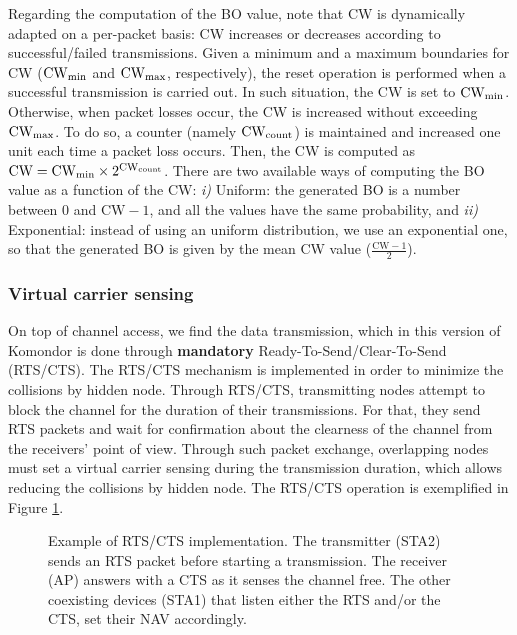 \documentclass[a4paper]{article}
\begin{document}
	Regarding the computation of the BO value, note that CW is dynamically adapted on a per-packet basis: CW increases or decreases according to successful/failed transmissions. Given a minimum and a maximum boundaries for CW ($\rm CW_{\rm min}$ and $\rm CW_{\rm max}$, respectively), the reset operation is performed when a successful transmission is carried out. In such situation, the CW is set to $\rm CW_{\rm min}$. Otherwise, when packet losses occur, the CW is increased without exceeding $\rm CW_{\rm max}$. To do so, a counter (namely $\rm CW_{\rm count}$) is maintained and increased one unit each time a packet loss occurs. Then, the CW is computed as $\rm CW = \rm CW_{\rm min} \times 2^{\rm CW_{\rm count}}$. There are two available ways of computing the BO value as a function of the CW: \emph{i)} Uniform: the generated BO is a number between 0 and $\text{CW}-1$, and all the values have the same probability, and \emph{ii)} Exponential: instead of using an uniform distribution, we use an exponential one, so that the generated BO is given by the mean CW value ($\frac{\text{CW}-1}{2}$).

	\subsubsection{Virtual carrier sensing}
	On top of channel access, we find the data transmission, which in this version of Komondor is done through \textbf{mandatory} Ready-To-Send/Clear-To-Send (RTS/CTS). The RTS/CTS mechanism is implemented in order to minimize the collisions by hidden node. Through RTS/CTS, transmitting nodes attempt to block the channel for the duration of their transmissions. For that, they send RTS packets and wait for confirmation about the clearness of the channel from the receivers' point of view. Through such packet exchange, overlapping nodes must set a virtual carrier sensing during the transmission duration, which allows reducing the collisions by hidden node. The RTS/CTS operation is exemplified in Figure \ref{fig:rts_cts_mechanism}.
	\begin{figure}[h!]
		\centering
		\caption{Example of RTS/CTS implementation. The transmitter (STA2) sends an RTS packet before starting a transmission. The receiver (AP) answers with a CTS as it senses the channel free. The other coexisting devices (STA1) that listen either the RTS and/or the CTS, set their NAV accordingly.}
		\label{fig:rts_cts_mechanism}
	\end{figure}	
	
\end{document}
